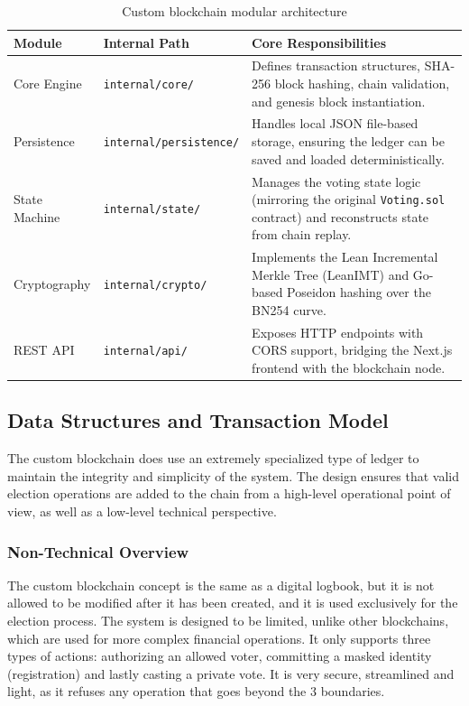 \documentclass[12pt, a4paper]{report}
\begin{document}
\begin{table}[H]
\centering
\caption{Custom blockchain modular architecture}
\label{tab:blockchain_modules}
\begin{tabular}{|l|l|p{7cm}|}
\hline
\textbf{Module} & \textbf{Internal Path} & \textbf{Core Responsibilities} \\ \hline
Core Engine & \texttt{internal/core/} & Defines transaction structures, SHA-256 block hashing, chain validation, and genesis block instantiation. \\ \hline
Persistence & \texttt{internal/persistence/} & Handles local JSON file-based storage, ensuring the ledger can be saved and loaded deterministically. \\ \hline
State Machine & \texttt{internal/state/} & Manages the voting state logic (mirroring the original \texttt{Voting.sol} contract) and reconstructs state from chain replay. \\ \hline
Cryptography & \texttt{internal/crypto/} & Implements the Lean Incremental Merkle Tree (LeanIMT) and Go-based Poseidon hashing over the BN254 curve. \\ \hline
REST API & \texttt{internal/api/} & Exposes HTTP endpoints with CORS support, bridging the Next.js frontend with the blockchain node. \\ \hline
\end{tabular}
\end{table}

\subsection{Data Structures and Transaction Model}

The custom blockchain does use an extremely specialized type of ledger to maintain the integrity and simplicity of the system. The design ensures that valid election operations are added to the chain from a high-level operational point of view, as well as a low-level technical perspective.

\subsubsection*{Non-Technical Overview}
The custom blockchain concept is the same as a digital logbook, but it is not allowed to be modified after it has been created, and it is used exclusively for the election process. The system is designed to be limited, unlike other blockchains, which are used for more complex financial operations. It only supports three types of actions: authorizing an allowed voter, committing a masked identity (registration) and lastly casting a private vote. It is very secure, streamlined and light, as it refuses any operation that goes beyond the 3 boundaries.
\end{document}
